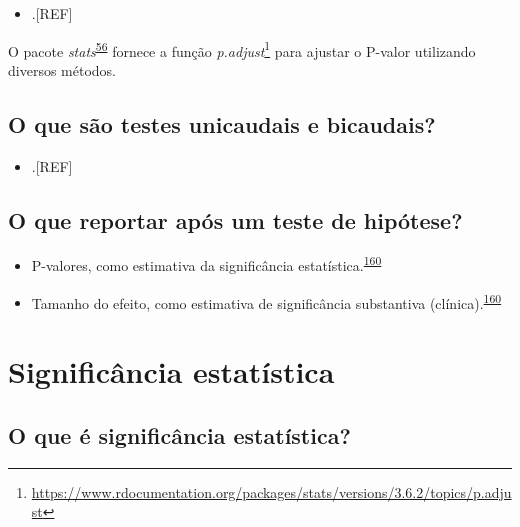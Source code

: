 \documentclass[
  a4paper,
]{book}
\providecommand{\tightlist}{%
  \setlength{\itemsep}{0pt}\setlength{\parskip}{0pt}}
\renewcommand{\href}[2]{#2\footnote{\url{#1}}}
\newenvironment{infobox}[1]
  {
  \begin{itemize}
  \renewcommand{\labelitemi}{
    \raisebox{-.7\height}[0pt][0pt]{
      {\setkeys{Gin}{width=3em,keepaspectratio}
        \texttt{[image: \#1]}}
    }
  }
  \setlength{\fboxsep}{1em}
  \begin{blackbox}
  \item
  }
  {
  \end{blackbox}
  \end{itemize}
  }
\begin{document}
\begin{itemize}
\tightlist
\item
  .{[}REF{]}
\end{itemize}

\begin{infobox}{images/Rlogo}
O pacote \emph{stats}\textsuperscript{\protect\hyperlink{ref-stats-2}{56}} fornece a função \href{https://www.rdocumentation.org/packages/stats/versions/3.6.2/topics/p.adjust}{\emph{p.adjust}} para ajustar o P-valor utilizando diversos métodos.

\end{infobox}

\hypertarget{o-que-suxe3o-testes-unicaudais-e-bicaudais}{%
\subsection{O que são testes unicaudais e bicaudais?}\label{o-que-suxe3o-testes-unicaudais-e-bicaudais}}

\begin{itemize}
\tightlist
\item
  .{[}REF{]}
\end{itemize}

\hypertarget{o-que-reportar-apuxf3s-um-teste-de-hipuxf3tese}{%
\subsection{O que reportar após um teste de hipótese?}\label{o-que-reportar-apuxf3s-um-teste-de-hipuxf3tese}}

\begin{itemize}
\item
  P-valores, como estimativa da significância estatística.\textsuperscript{\protect\hyperlink{ref-Sullivan2012}{160}}
\item
  Tamanho do efeito, como estimativa de significância substantiva (clínica).\textsuperscript{\protect\hyperlink{ref-Sullivan2012}{160}}
\end{itemize}

\hypertarget{significancia-estatistica}{%
\section{Significância estatística}\label{significancia-estatistica}}

\hypertarget{o-que-uxe9-significuxe2ncia-estatuxedstica}{%
\subsection{O que é significância estatística?}\label{o-que-uxe9-significuxe2ncia-estatuxedstica}}
\end{document}
